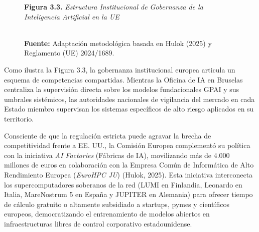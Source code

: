\begin{figure}[htbp]
\centering
\begin{tcolorbox}[colback=white, colframe=unmsm_gold, arc=3pt, boxrule=0.8pt, top=0.3cm, bottom=0.3cm, left=0.4cm, right=0.4cm]
\centering
\small\sffamily
\textbf{Figura 3.3.} \textit{Estructura Institucional de Gobernanza de la Inteligencia Artificial en la UE}\\[0.25cm]
\\[0.2cm]
\raggedright
\scriptsize \textbf{Fuente:} Adaptación metodológica basada en Hulok (2025) y Reglamento (UE) 2024/1689.
\end{tcolorbox}
\label{fig:gobernanza_ue}
\end{figure}

Como ilustra la Figura 3.3, la gobernanza institucional europea articula un esquema de competencias compartidas. Mientras la Oficina de IA en Bruselas centraliza la supervisión directa sobre los modelos fundacionales GPAI y sus umbrales sistémicos, las autoridades nacionales de vigilancia del mercado en cada Estado miembro supervisan los sistemas específicos de alto riesgo aplicados en su territorio.

Consciente de que la regulación estricta puede agravar la brecha de competitividad frente a EE. UU., la Comisión Europea complementó su política con la iniciativa \textit{AI Factories} (Fábricas de IA), movilizando más de 4.000 millones de euros en colaboración con la Empresa Común de Informática de Alto Rendimiento Europea (\textit{EuroHPC JU}) (Hulok, 2025). Esta iniciativa interconecta los supercomputadores soberanos de la red (LUMI en Finlandia, Leonardo en Italia, MareNostrum 5 en España y JUPITER en Alemania) para ofrecer tiempo de cálculo gratuito o altamente subsidiado a startups, pymes y científicos europeos, democratizando el entrenamiento de modelos abiertos en infraestructuras libres de control corporativo estadounidense.

